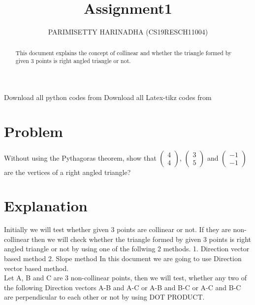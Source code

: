 \documentclass[journal,12pt,twocolumn]{IEEEtran}
\title{ Assignment1}
\author{PARIMISETTY HARINADHA (CS19RESCH11004)}
\newcommand{\myvec}[1]{\ensuremath{\begin{pmatrix}#1\end{pmatrix}}}
\begin{document}
\maketitle
\newpage
\begin{abstract}
This document explains the concept of collinear and whether the triangle formed by given 3 points is right angled triangle or not.
\end{abstract}
Download all python codes from 
Download all Latex-tikz codes from 
\section{Problem}
Without using the Pythagoras theorem, show that \myvec{ 4 \\ 4 }, \myvec{ 3 \\ 5 } and \myvec{ -1 \\ -1 } are the vertices of a right angled triangle?
\section{Explanation}
Initially we will test whether given 3 points are collinear or not. If they are non-collinear then we will check whether the triangle formed by given 3 points is right angled triangle or not by using one of the follwing 2 methods.
1. Direction vector based method
2. Slope method
In this document we are going to use Direction vector based method.\\
	Let A, B and C are 3 non-collinear points, then we will test, whether any two of the following Direction vectors A-B and A-C or A-B and B-C or A-C and B-C are perpendicular to each other or not by using DOT PRODUCT.
\end{document}
